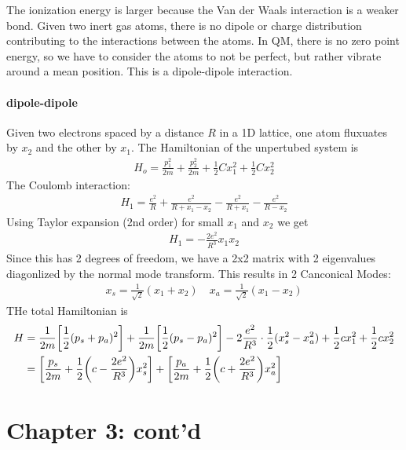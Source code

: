 \documentclass[../main.tex]{subfiles}
\begin{document}
The ionization energy is larger because the Van der Waals interaction is a weaker bond. Given two
inert gas atoms, there is no dipole or charge distribution contributing to the interactions between
the atoms. In QM, there is no zero point energy, so we have to consider the atoms to not be perfect,
but rather vibrate around a mean position. This is a dipole-dipole interaction. 

\paragraph{dipole-dipole }Given two electrons spaced by a distance $R$ in a 1D lattice, one atom
fluxuates by $x_2$ and the other by $x_1$. The Hamiltonian of the unpertubed system is
\begin{align*}
    H_o = \frac{p_1^2}{2m} + \frac{p_2^2}{2m} + \frac{1}{2} C x_1^2 + \frac{1}{2} C x_2^2
\end{align*}
The Coulomb interaction:
\begin{align*}
    H_1 = \frac{e^2}{R} + \frac{e^2}{R + x_1 - x_2} - \frac{e^2}{R + x_1} - \frac{e^2}{R - x_2}
\end{align*}
Using Taylor expansion (2nd order) for small $x_1$ and $x_2$ we get
\begin{align*}
    H_1 = -\frac{2e^2}{R^3} x_1 x_2
\end{align*}
Since this has 2 degrees of freedom, we have a 2x2 matrix with 2 eigenvalues diagonlized by the
normal mode transform. This results in 2 Canconical Modes:
\begin{align*}
    x_s = \frac{1}{\sqrt{2}}(x_1 + x_2) \quad x_a = \frac{1}{\sqrt{2}}(x_1 - x_2)
\end{align*}
THe total Hamiltonian is
\begin{align*}
    H &= \frac{1}{2m} \qt[\frac{1}{2}(p_s + p_a)^2] + \frac{1}{2m}\qt[\frac{1}{2}(p_s - p_a)^2]
    - 2 \frac{e^2}{R^3} \cdot \frac{1}{2} (x_s^2 - x_a^2) + \frac{1}{2} cx_1^2 + \frac{1}{2} cx_2^2\\
    &= \qt[\frac{p_s}{2m} + \frac{1}{2} \qt(c - \frac{2e^2}{R^3})x_s^2] +
    \qt[\frac{p_a}{2m} + \frac{1}{2} \qt(c + \frac{2e^2}{R^3})x_a^2]
\end{align*}

\pagebreak
{}

\section*{Chapter 3: cont'd}
\end{document}
